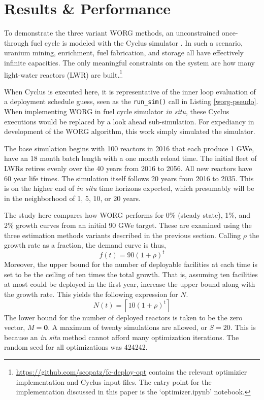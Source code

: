 \section{Results \& Performance}
\label{results}

To demonstrate the three variant WORG methods, an unconstrained
once-through fuel cycle is modeled with the Cyclus simulator
\cite{DBLP:journals/corr/HuffGCFMOSSW15}. In such a scenario, uranium
mining, enrichment, fuel fabrication, and storage all have effectively
infinite capacities. The only meaningful constraints on the system are
how many light-water reactors (LWR) are
built.\footnote{\url{https://github.com/scopatz/fc-deploy-opt}
contains the relevant optimizier implementation and Cyclus input files.
The entry point for the implementation discussed in this paper is the
`optimizer.ipynb' notebook.}

When Cyclus is executed here, it is representative of the inner loop
evaluation of a deployment schedule guess, seen as the \texttt{run\_sim()}
call in Listing \ref{worg-pseudo}. When implementing WORG in fuel cycle
simulator \emph{in situ}, these Cyclus executions would be replaced by
a look ahead sub-simulation. For expediancy in development of the WORG
algorithm, this work simply simulated the simulator.

The base simulation begins with 100 reactors in 2016 that each produce
1 GWe, have an 18 month batch length with a one month reload time.
The initial fleet of LWRs retires evenly over the 40 years from 2016 to
2056. All new reactors have 60 year life times.  The simulation itself
follows 20 years from 2016 to 2035. This is on the higher end of
\emph{in situ} time horizons expected, which presumably
will be in the neighborhood of 1, 5, 10, or 20 years.

The study here compares how WORG performs for 0\% (steady state), 1\%,
and 2\% growth curves from an initial 90 GWe target. These are examined
using the three estimation methods variants described in the previous section.
Calling $\rho$ the growth rate as a
fraction, the demand curve is thus,
\begin{equation}
\label{f-rate}
f(t) = 90 (1 + \rho)^t
\end{equation}
Moreover, the upper bound for the number of deployable facilities at
each time is set to be the ceiling of ten times the total growth.
That is, assuming ten facilities at most could be deployed in the first
year, increase the upper bound along with the growth rate.  This yields
the following expression for $N$.
\begin{equation}
\label{n-rate}
N(t) = \left\lceil 10 (1 + \rho)^t\right\rceil
\end{equation}
The lower bound for the number of deployed reactors is taken to be the
zero vector, $M = \mathbf{0}$.  A maximum of twenty simulations are allowed,
or $S = 20$.
This is because an \emph{in situ} method cannot afford many optimization
iterations. The random seed for all optimizations was 424242.

